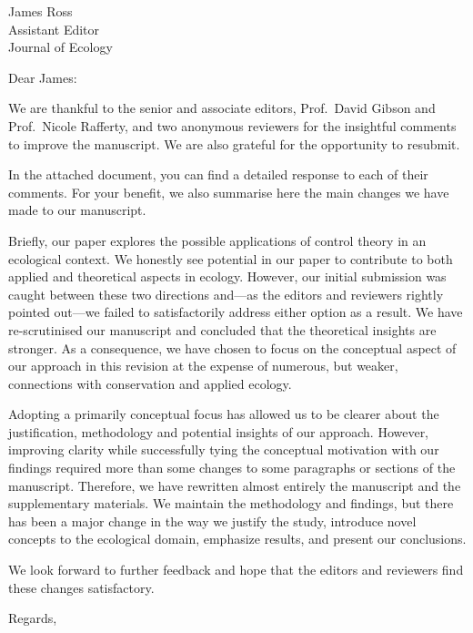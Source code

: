 \documentclass{letter}
\begin{document}
\begin{letter}{James Ross \\ Assistant Editor \\ Journal of Ecology}
\opening{Dear James:}

\onehalfspacing

We are thankful to the senior and associate editors, Prof.\ David Gibson and Prof.\ Nicole Rafferty, and two anonymous reviewers for the insightful comments to improve the manuscript. 
We are also grateful for the opportunity to resubmit. 

In the attached document, you can find a detailed response to each of their comments. 
For your benefit, we also summarise here the main changes we have made to our manuscript. 

Briefly, our paper explores the possible applications of control theory in an ecological context. 
We honestly see potential in our paper to contribute to both applied and theoretical aspects in ecology. 
However, our initial submission was caught between these two directions and---as the editors and reviewers rightly pointed out---we failed to satisfactorily address either option as a result.
We have re-scrutinised our manuscript and concluded that the theoretical insights are stronger. 
As a consequence, we have chosen to focus on the conceptual aspect of our approach in this revision at the expense of numerous, but weaker, connections with conservation and applied ecology.

Adopting a primarily conceptual focus has allowed us to be clearer about the justification, methodology and potential insights of our approach. 
However, improving clarity while successfully tying the conceptual motivation with our findings required more than some changes to some paragraphs or sections of the manuscript. 
Therefore, we have rewritten almost entirely the manuscript and the supplementary materials. 
We maintain the methodology and findings, but there has been a major change in the way we justify the study, introduce novel concepts to the ecological domain, emphasize results, and present our conclusions. 

We look forward to further feedback and hope that the editors and reviewers find these changes satisfactory.

\closing{Regards,}
\end{letter}
\end{document}
